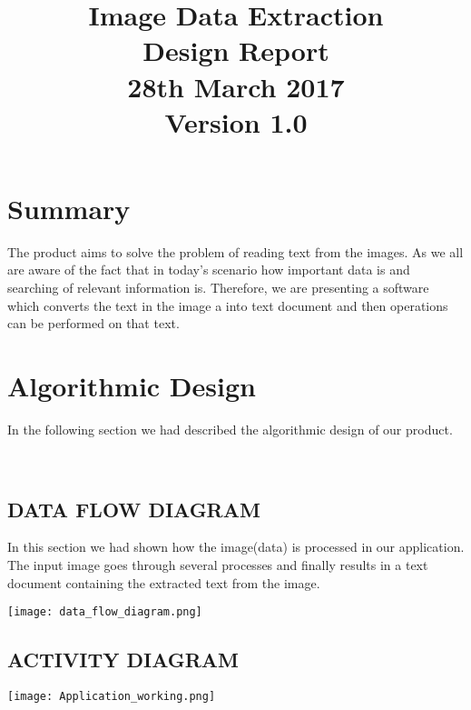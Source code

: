\documentclass[18 pt]{article}
\begin{document}
\begin{Large}

\title{Image Data Extraction\\
Design Report\\
28th March 2017\\
Version 1.0
}
\date{}
\maketitle
\begin{flushleft}

\section{Summary}
The product aims to solve the problem of reading text from the images. As we all are aware of the fact that in today's scenario how important data is and searching of relevant information is. Therefore, we are presenting a software which converts the text in the image a into text document and then operations can be performed on that text. \\
\section{Algorithmic Design}
In the following section we had described the algorithmic design of our product.

\
\
\
\subsection{DATA FLOW DIAGRAM}
In this section we had shown how the image(data) is processed  in our application. The input image goes through several processes and finally results in a text document containing the extracted text from the image.
\begin{center}
\texttt{[image: data\_flow\_diagram.png]}\\
\end{center}

\subsection{ACTIVITY DIAGRAM}

\begin{center}
\texttt{[image: Application\_working.png]}\\
\end{center}


\end{flushleft}
\end{Large}
\end{document}
